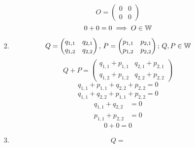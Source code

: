 \documentclass[../practica.root.tex]{subfiles}
\begin{document}
\begin{enumerate}
\begin{enumerate}
\begin{enumerate}
\[                                  O =
                                  \begin{pmatrix}
                                      0 & 0 \\
                                      0 & 0
                                  \end{pmatrix}
                              \]
                              \[ 0 + 0 = 0 \implies O \in \mathbb{W} \]
                        \item \[
                                  Q =
                                  \begin{pmatrix}
                                      q_{1,1} & q_{2,1} \\
                                      q_{1,2} & q_{2,2}
                                  \end{pmatrix}
                                  \text{, }
                                  P =
                                  \begin{pmatrix}
                                      p_{1,1} & p_{2,1} \\
                                      p_{1,2} & p_{2,2}
                                  \end{pmatrix}
                                  \text{; }
                                  Q, P \in \mathbb{W}
                              \]
                              \[
                                  Q + P =
                                  \begin{pmatrix}
                                      q_{1,1} + p_{1,1} & q_{2,1} + p_{2,1} \\
                                      q_{1,2} + p_{1,2} & q_{2,2} + p_{2,2}
                                  \end{pmatrix}
                              \]
                              \[ q_{1,1} + p_{1,1} + q_{2,2} + p_{2,2} = 0 \]
                              \[ q_{1,1} + q_{2,2} + p_{1,1} + p_{2,2} = 0 \]
                              \[
                                  \begin{array}{rl}
                                      q_{1,1} + q_{2,2} & = 0 \\
                                      p_{1,1} + p_{2,2} & = 0
                                  \end{array}
                              \]
                              \[ 0 + 0 = 0 \]
                        \item \[
                                  Q =
\]
\end{enumerate}
\end{enumerate}
\end{enumerate}
\end{document}
